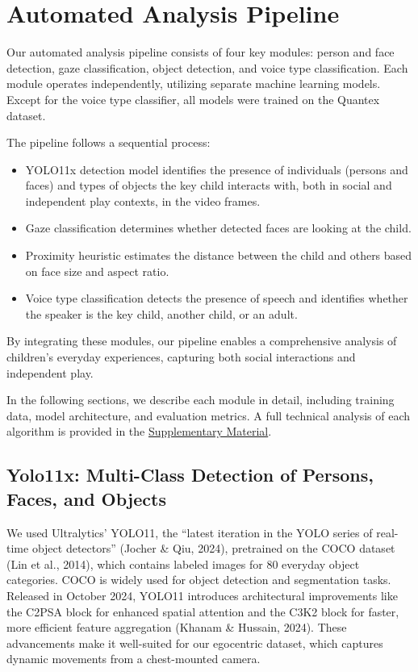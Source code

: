 \documentclass[
  man,floatsintext]{apa6}
\providecommand{\tightlist}{%
  \setlength{\itemsep}{0pt}\setlength{\parskip}{0pt}}
\begin{document}
\section{Automated Analysis Pipeline}\label{automatic-analysis}

Our automated analysis pipeline consists of four key modules: person and face detection, gaze classification, object detection, and voice type classification. Each module operates independently, utilizing separate machine learning models. Except for the voice type classifier, all models were trained on the Quantex dataset.

The pipeline follows a sequential process:

\begin{itemize}
\tightlist
\item
  YOLO11x detection model identifies the presence of individuals (persons and faces) and types of objects the key child interacts with, both in social and independent play contexts, in the video frames.
\item
  Gaze classification determines whether detected faces are looking at the child.
\item
  Proximity heuristic estimates the distance between the child and others based on face size and aspect ratio.
\item
  Voice type classification detects the presence of speech and identifies whether the speaker is the key child, another child, or an adult.
\end{itemize}

By integrating these modules, our pipeline enables a comprehensive analysis of children's everyday experiences, capturing both social interactions and independent play.

In the following sections, we describe each module in detail, including training data, model architecture, and evaluation metrics. A full technical analysis of each algorithm is provided in the \hyperref[supplementary-material]{Supplementary Material}.

\subsection{Yolo11x: Multi-Class Detection of Persons, Faces, and Objects}\label{yolo11x}

We used Ultralytics' YOLO11, the ``latest iteration in the YOLO series of real-time object detectors'' (Jocher \& Qiu, 2024), pretrained on the COCO dataset (Lin et al., 2014), which contains labeled images for 80 everyday object categories. COCO is widely used for object detection and segmentation tasks. Released in October 2024, YOLO11 introduces architectural improvements like the C2PSA block for enhanced spatial attention and the C3K2 block for faster, more efficient feature aggregation (Khanam \& Hussain, 2024). These advancements make it well-suited for our egocentric dataset, which captures dynamic movements from a chest-mounted camera.
\end{document}
